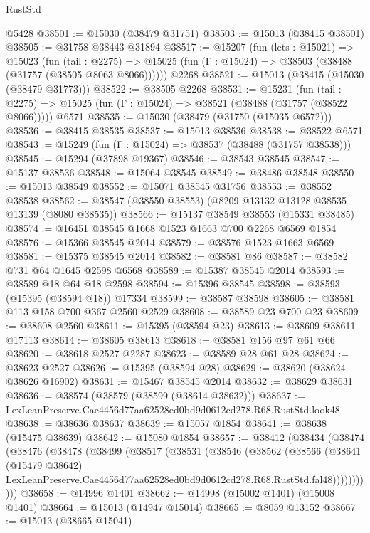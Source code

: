 \begin{lexlean}{RustStd}
\begin{coremodule}
    @5428
@38501 := @15030 (@38479 @31751)
@38503 := @15013 (@38415 @38501)
@38505 := @31758 @38443 @31894
@38517 := @15207
    (fun (lets : @15021) =>
    @15023
      (fun (tail : @2275) =>
      @15025 (fun (Γ : @15024) => @38503 (@38488 (@31757 (@38505 @8063 @8066))))))
    @2268
@38521 := @15013 (@38415 (@15030 (@38479 @31773)))
@38522 := @38505 @2268
@38531 := @15231
    (fun (tail : @2275) => @15025 (fun (Γ : @15024) => @38521 (@38488 (@31757 (@38522 @8066)))))
    @6571
@38535 := @15030 (@38479 (@31750 (@15035 @6572)))
@38536 := @38415 @38535
@38537 := @15013 @38536
@38538 := @38522 @6571
@38543 := @15249 (fun (Γ : @15024) => @38537 (@38488 (@31757 @38538)))
@38545 := @15294 (@37898 @19367)
@38546 := @38543 @38545
@38547 := @15137 @38536
@38548 := @15064 @38545
@38549 := @38486 @38548
@38550 := @15013 @38549
@38552 := @15071 @38545 @31756
@38553 := @38552 @38538
@38562 := @38547 (@38550 @38553) (@8209 @13132 @13128 @38535 @13139 (@8080 @38535))
@38566 := @15137 @38549 @38553 (@15331 @38485)
@38574 := @16451 @38545 @1668 @1523 @1663 @700 @2268 @6569 @1854
@38576 := @15366 @38545 @2014
@38579 := @38576 @1523 @1663 @6569
@38581 := @15375 @38545 @2014
@38582 := @38581 @86
@38587 := @38582 @731 @64 @1645 @2598 @6568
@38589 := @15387 @38545 @2014
@38593 := @38589 @18 @64 @18 @2598
@38594 := @15396 @38545
@38598 := @38593 (@15395 (@38594 @18)) @17334
@38599 := @38587 @38598
@38605 := @38581 @113 @158 @700 @367 @2560 @2529
@38608 := @38589 @23 @700 @23
@38609 := @38608 @2560
@38611 := @15395 (@38594 @23)
@38613 := @38609 @38611 @17113
@38614 := @38605 @38613
@38618 := @38581 @156 @97 @61 @66
@38620 := @38618 @2527 @2287
@38623 := @38589 @28 @61 @28
@38624 := @38623 @2527
@38626 := @15395 (@38594 @28)
@38629 := @38620 (@38624 @38626 @16902)
@38631 := @15467 @38545 @2014
@38632 := @38629 @38631
@38636 := @38574 (@38579 (@38599 (@38614 @38632)))
@38637 := LexLeanPreserve.Cae4456d77aa62528ed0bd9d0612cd278.R68.RustStd.look48
@38638 := @38636 @38637
@38639 := @15057 @1854
@38641 := @38638 (@15475 @38639)
@38642 := @15080 @1854
@38657 := @38412
    (@38434
      (@38474
        (@38476
          (@38478
            (@38499
              (@38517
                (@38531
                  (@38546
                    (@38562
                      (@38566
                        (@38641
                          (@15479 @38642)
                          LexLeanPreserve.Cae4456d77aa62528ed0bd9d0612cd278.R68.RustStd.fal48)))))))))))
@38658 := @14996 @1401
@38662 := @14998 (@15002 @1401) (@15008 @1401)
@38664 := @15013 (@14947 @15014)
@38665 := @8059 @13152
@38667 := @15013 (@38665 @15041)

\end{coremodule}
\end{lexlean}
